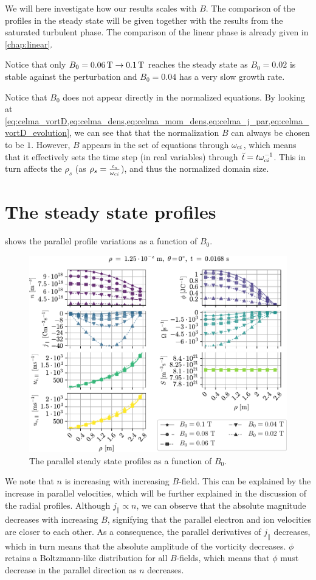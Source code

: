 %
We will here investigate how our results scales with $B$.
The comparison of the profiles in the steady state will be given together with the results from the saturated turbulent phase.
The comparison of the linear phase is already given in \cref{chap:linear}.

Notice that only $B_0 = 0.06\, \text{T} \to 0.1\, \text{T}$ reaches the steady state as $B_0 = 0.02$ is stable against the perturbation and $B_0 = 0.04$ has a very slow growth rate.

Notice that $B_0$ does not appear directly in the normalized equations.
By looking at \cref{eq:celma_vortD,eq:celma_dens,eq:celma_mom_dens,eq:celma_j_par,eq:celma_vortD_evolution}, we can see that that the normalization $B$ can always be chosen to be $1$.
However, $B$ appears in the set of equations through $\omega_{ci}$, which means that it effectively sets the time step (in real variables) through $\breve{t}=t\omega_{ci}^{-1}$.
This in turn affects the $\rho_s$ (as $\rho_s=\frac{c_s}{\omega_{ci}}$), and thus the normalized domain size.

\section{The steady state profiles}
%
 shows the parallel profile variations as a function of $B_0$.
%
\begin{figure}[htb]
    \centering
    \includegraphics{fig/results/bScan/BScanPar}
    \caption{The parallel steady state profiles as a function of $B_0$.}
    \label{fig:linBScanPar}
\end{figure}
%
We note that $n$ is increasing with increasing $B$-field.
This can be explained by the increase in parallel velocities, which will be further explained in the discussion of the radial profiles.
Although $j_\| \propto n$, we can observe that the absolute magnitude decreases with increasing $B$, signifying that the parallel electron and ion velocities are closer to each other.
As a consequence, the parallel derivatives of $j_\|$ decreases, which in turn means that the absolute amplitude of the vorticity decreases.
$\phi$ retains a Boltzmann-like distribution for all $B$-fields, which means that $\phi$ must decrease in the parallel direction as $n$ decreases.

